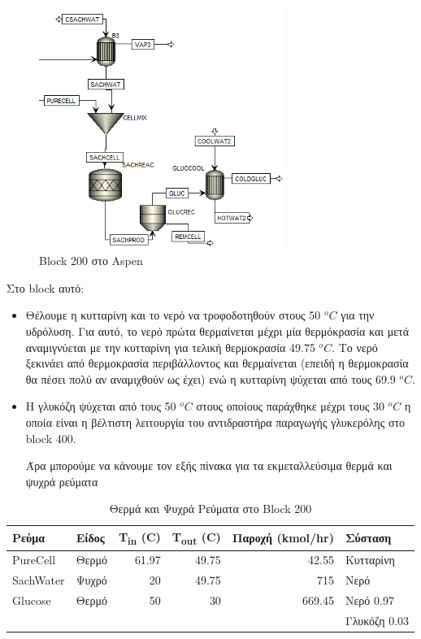 \documentclass[11pt]{article}
\begin{document}
\begin{figure}[htbp]
\centering
\includegraphics[width=300px]{Block_200_-_Παραγωγή_Γλυκόζης/2023-03-11_16-51-41_screenshot.png}
\caption{Block 200 στο Aspen}
\end{figure}


Στο block αυτό:
\begin{itemize}
\item Θέλουμε η κυτταρίνη και το νερό να τροφοδοτηθούν στους 50 \(^oC\) για την υδρόλυση. Για αυτό, το νερό πρώτα θερμαίνεται μέχρι μία θερμόκρασία και μετά αναμιγνύεται με την κυτταρίνη για τελική θερμοκρασία 49.75 \(^oC\). Το νερό ξεκινάει από θερμοκρασία περιβάλλοντος και θερμαίνεται (επειδή η θερμοκρασία θα πέσει πολύ αν αναμιχθούν ως έχει) ενώ η κυτταρίνη ψύχεται από τους 69.9 \(^oC\).
\item Η γλυκόζη ψύχεται από τους 50 \(^oC\) στους οποίους παράχθηκε μέχρι τους 30 \(^oC\) η οποία είναι η βέλτιστη λειτουργία του αντιδραστήρα παραγωγής γλυκερόλης στο block 400.

Άρα μπορούμε να κάνουμε τον εξής πίνακα για τα εκμεταλλεύσιμα θερμά και ψυχρά ρεύματα
\end{itemize}
\begin{table}[htbp]
\caption{Θερμά και Ψυχρά Ρεύματα στο Block 200}
\centering
\begin{tabular}{llrrrl}
Ρεύμα & Είδος & Τ\textsubscript{in} (C) & Τ\textsubscript{out} (C) & Παροχή (kmol/hr) & Σύσταση\\
\hline
PureCell & Θερμό & 61.97 & 49.75 & 42.55 & Κυτταρίνη\\
\hline
SachWater & Ψυχρό & 20 & 49.75 & 715 & Νερό\\
\hline
Glucose & Θερμό & 50 & 30 & 669.45 & Νερό 0.97\\
 &  &  &  &  & Γλυκόζη 0.03\\
\hline
\end{tabular}
\end{table}
\end{document}
